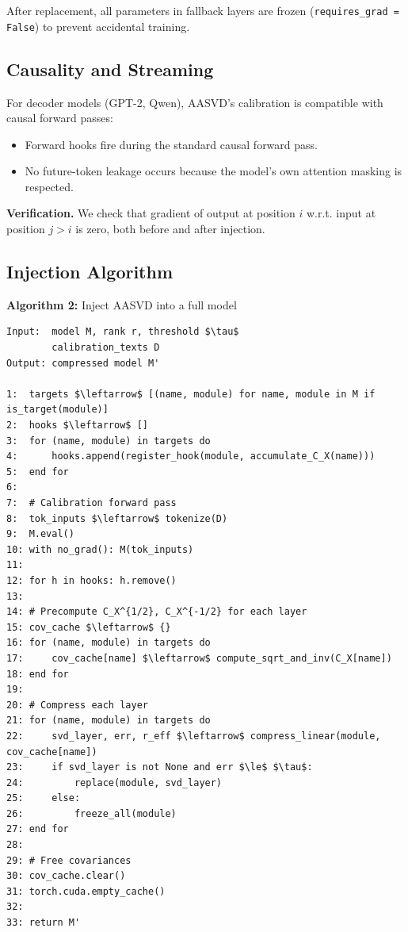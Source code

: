 After replacement, all parameters in fallback layers are frozen 
(\texttt{requires\_grad = False}) to prevent accidental training.

\subsection{Causality and Streaming}

For decoder models (GPT-2, Qwen), AASVD's calibration is compatible with 
causal forward passes:

\begin{itemize}
\item Forward hooks fire during the standard causal forward pass.
\item No future-token leakage occurs because the model's own attention
  masking is respected.

\end{itemize}
\textbf{Verification.} We check that gradient of output at position $i$ w.r.t. 
input at position $j > i$ is zero, both before and after injection.

\subsection{Injection Algorithm}

\textbf{Algorithm 2:} Inject AASVD into a full model
\begin{lstlisting}
Input:  model M, rank r, threshold $\tau$
        calibration_texts D
Output: compressed model M'

1:  targets $\leftarrow$ [(name, module) for name, module in M if is_target(module)]
2:  hooks $\leftarrow$ []
3:  for (name, module) in targets do
4:      hooks.append(register_hook(module, accumulate_C_X(name)))
5:  end for
6:
7:  # Calibration forward pass
8:  tok_inputs $\leftarrow$ tokenize(D)
9:  M.eval()
10: with no_grad(): M(tok_inputs)
11:
12: for h in hooks: h.remove()
13:
14: # Precompute C_X^{1/2}, C_X^{-1/2} for each layer
15: cov_cache $\leftarrow$ {}
16: for (name, module) in targets do
17:     cov_cache[name] $\leftarrow$ compute_sqrt_and_inv(C_X[name])
18: end for
19:
20: # Compress each layer
21: for (name, module) in targets do
22:     svd_layer, err, r_eff $\leftarrow$ compress_linear(module, cov_cache[name])
23:     if svd_layer is not None and err $\le$ $\tau$:
24:         replace(module, svd_layer)
25:     else:
26:         freeze_all(module)
27: end for
28:
29: # Free covariances
30: cov_cache.clear()
31: torch.cuda.empty_cache()
32:
33: return M'
\end{lstlisting}

